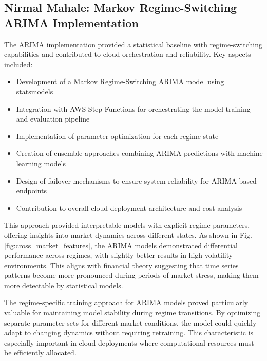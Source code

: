 \documentclass[conference]{IEEEtran}
\begin{document}
\subsection{Nirmal Mahale: Markov Regime-Switching ARIMA Implementation}
The ARIMA implementation provided a statistical baseline with regime-switching capabilities and contributed to cloud orchestration and reliability. Key aspects included:
\begin{itemize}
    \item Development of a Markov Regime-Switching ARIMA model using statsmodels
    \item Integration with AWS Step Functions for orchestrating the model training and evaluation pipeline
    \item Implementation of parameter optimization for each regime state
    \item Creation of ensemble approaches combining ARIMA predictions with machine learning models
    \item Design of failover mechanisms to ensure system reliability for ARIMA-based endpoints
    \item Contribution to overall cloud deployment architecture and cost analysis
\end{itemize}

This approach provided interpretable models with explicit regime parameters, offering insights into market dynamics across different states. As shown in Fig. \ref{fig:cross_market_features}, the ARIMA models demonstrated differential performance across regimes, with slightly better results in high-volatility environments. This aligns with financial theory suggesting that time series patterns become more pronounced during periods of market stress, making them more detectable by statistical models.

The regime-specific training approach for ARIMA models proved particularly valuable for maintaining model stability during regime transitions. By optimizing separate parameter sets for different market conditions, the model could quickly adapt to changing dynamics without requiring retraining. This characteristic is especially important in cloud deployments where computational resources must be efficiently allocated.
\end{document}

